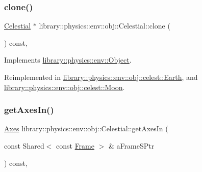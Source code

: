 \mbox{\label{classlibrary_1_1physics_1_1env_1_1obj_1_1_celestial_aaf8aa41a0ff9336eba62c07e3c27f82d}} 
\subsubsection{\texorpdfstring{clone()}{clone()}}
{\footnotesize\ttfamily \hyperlink{classlibrary_1_1physics_1_1env_1_1obj_1_1_celestial}{Celestial} $\ast$ library\+::physics\+::env\+::obj\+::\+Celestial\+::clone (\begin{DoxyParamCaption}{ }\end{DoxyParamCaption}) const\hspace{0.3cm}{\ttfamily [override]}, {\ttfamily [virtual]}}



Implements \hyperlink{classlibrary_1_1physics_1_1env_1_1_object_a498e0d1a15e937a5aa77374c6f899768}{library\+::physics\+::env\+::\+Object}.



Reimplemented in \hyperlink{classlibrary_1_1physics_1_1env_1_1obj_1_1celest_1_1_earth_aca39bec00a2046a3fcef9bf22be52428}{library\+::physics\+::env\+::obj\+::celest\+::\+Earth}, and \hyperlink{classlibrary_1_1physics_1_1env_1_1obj_1_1celest_1_1_moon_a9d922ab338809a6c1052edbe11ce3e60}{library\+::physics\+::env\+::obj\+::celest\+::\+Moon}.

\mbox{\label{classlibrary_1_1physics_1_1env_1_1obj_1_1_celestial_a51d7ed3c0dcf627fbbcd81f9b190fb6b}} 
\subsubsection{\texorpdfstring{get\+Axes\+In()}{getAxesIn()}}
{\footnotesize\ttfamily \hyperlink{classlibrary_1_1physics_1_1coord_1_1_axes}{Axes} library\+::physics\+::env\+::obj\+::\+Celestial\+::get\+Axes\+In (\begin{DoxyParamCaption}\item[{const Shared$<$ const \hyperlink{classlibrary_1_1physics_1_1coord_1_1_frame}{Frame} $>$ \&}]{a\+Frame\+S\+Ptr }\end{DoxyParamCaption}) const\hspace{0.3cm}{\ttfamily [override]}, {\ttfamily [virtual]}}



